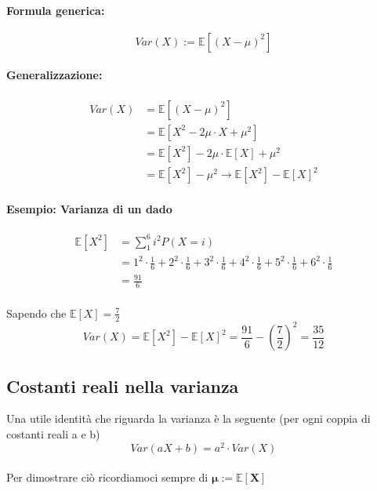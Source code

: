 \documentclass[]{article}
\newcommand{\ev}{\mathbb{E}[X]}
\renewcommand{\ev}[1]{\mathbb{E}[#1]}
\newcommand{\formula}{\paragraph{Formula generica:}}
\begin{document}
    \formula \[ Var(X) := \ev{(X - \mu)^2} \]
    \paragraph{Generalizzazione:}
    \begin{equation*}
        \begin{split}
            Var(X) & = \ev{(X - \mu)^2} \\
            & = \ev{X^2 - 2 \mu \cdot X + \mu^2} \\
            & = \ev{X^2} - 2 \mu \cdot \ev{X} + \mu^2 \\
            & = \ev{X^2} - \mu^2 \longrightarrow \ev{X^2} - \ev{X}^2
        \end{split}
    \end{equation*}
    
    \paragraph{Esempio: Varianza di un dado}
    \begin{equation*}
        \begin{split}
            \ev{X^2} & = \sum_{1}^{6} i^2 P(X = i) \\
            & = 1^2 \cdot \frac{1}{6} + 2^2 \cdot \frac{1}{6} + 3^2 \cdot \frac{1}{6} + 4^2 \cdot \frac{1}{6} + 5^2 \cdot \frac{1}{6} + 6^2 \cdot \frac{1}{6} \\
            & = \frac{91}{6}
        \end{split}
    \end{equation*} \\

    Sapendo che $\ev{X} = \frac{7}{2}$
    \[ Var(X) = \ev{X^2} - \ev{X}^2 = \frac{91}{6} - (\frac{7}{2})^2 = \frac{35}{12} \]

    \subsection{Costanti reali nella varianza}
    Una utile identità che riguarda la varianza è la seguente (per ogni coppia di costanti reali a e b)
    \[ Var(aX + b) = a^2 \cdot Var(X) \] \\
    Per dimostrare ciò ricordiamoci sempre di $\boldsymbol{\mu := \ev{X}}$
\end{document}
